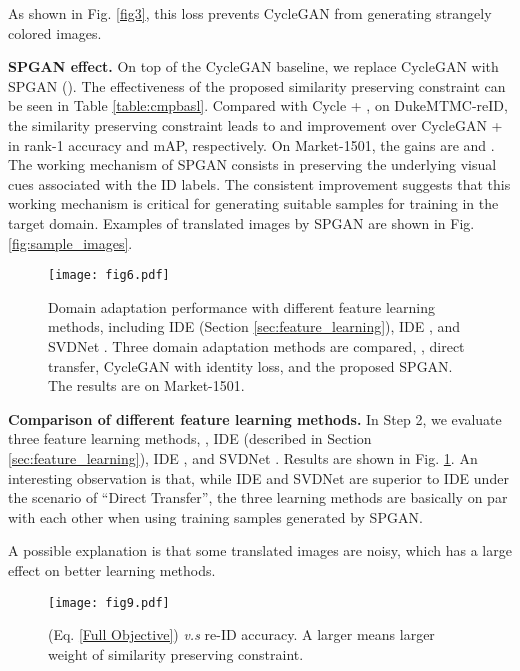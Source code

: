 \documentclass[10pt,twocolumn,letterpaper]{article}
\begin{document}
{As shown in Fig. \ref{fig3}, this loss prevents CycleGAN from generating strangely colored images.

\textbf{SPGAN effect.} On top of the CycleGAN baseline, we replace CycleGAN with SPGAN (). The effectiveness of the proposed similarity preserving constraint can be seen in Table \ref{table:cmpbasl}. Compared with Cycle + , on DukeMTMC-reID, the similarity preserving constraint leads to  and  improvement over CycleGAN +  in rank-1 accuracy and mAP, respectively. On Market-1501, the gains are  and . The working mechanism of SPGAN consists in preserving the underlying visual cues associated with the ID labels. The consistent improvement suggests that this working mechanism is critical for generating suitable samples for training in the target domain. Examples of translated images by SPGAN are shown in Fig. \ref{fig:sample_images}.


\begin{figure}[t]
\setlength{\abovecaptionskip}{-0.2cm} 
\setlength{\belowcaptionskip}{-0.3cm}
\begin{center}
\texttt{[image: fig6.pdf]}
\end{center}
\caption{Domain adaptation performance with different feature learning methods, including IDE (Section \ref{sec:feature_learning}), IDE \cite{zhong2017re}, and SVDNet \cite{SVD}. Three domain adaptation methods are compared, \ie, direct transfer, CycleGAN with identity loss, and the proposed SPGAN. The results are on Market-1501.}
\label{fig:fig6}
\end{figure}


\textbf{Comparison of different feature learning methods.} In Step 2, we evaluate three feature learning methods, \ie, IDE \cite{DBLP:journals/corr/ZhengYH16} (described in Section \ref{sec:feature_learning}), IDE \cite{zhong2017re}, and SVDNet \cite{SVD}. Results are shown in Fig. \ref{fig:fig6}. 
An interesting observation is that, while IDE and SVDNet are superior to IDE under the scenario of ``Direct Transfer'', the three learning methods are basically on par with each other when using training samples generated by SPGAN.

A possible explanation is that some translated images are noisy, which has a large effect on better learning methods.
\begin{figure}[t]
\setlength{\abovecaptionskip}{-0.2cm} 
\setlength{\belowcaptionskip}{-0.2cm}
\begin{center}
\texttt{[image: fig9.pdf]}
\end{center}
\caption{ (Eq. \ref{Full Objective}) \emph{v.s} re-ID accuracy. A larger  means larger weight of  similarity preserving constraint.}
\label{fig:fig8}
\end{figure}


}
\end{document}
